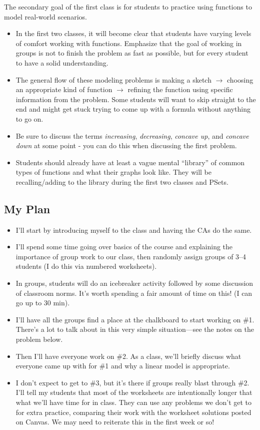 \documentclass[10pt]{article}
\begin{document}
\begin{plan}
    The secondary goal of the first class is for students to practice using functions to model real-world scenarios.
    \begin{itemize}
        \item In the first two classes, it will become clear that students have varying levels of comfort working with functions. Emphasize that the goal of working in groups is not to finish the problem as fast as possible, but for every student to have a solid understanding.
        \item The general flow of these modeling problems is making a sketch $\rightarrow$ choosing an appropriate kind of function $\rightarrow$ refining the function using specific information from the problem. Some students will want to skip straight to the end and might get stuck trying to come up with a formula without anything to go on.
        \item Be sure to discuss the terms \emph{increasing}, \emph{decreasing}, \emph{concave up}, and \emph{concave down} at some point - you can do this when discussing the first problem.
        \item Students should already have at least a vague mental ``library'' of common types of functions and what their graphs look like. They will be recalling/adding to the library during the first two classes and PSets.
    \end{itemize}
    
    \subsection{My Plan} %
    \begin{itemize}
        \item I'll start by introducing myself to the class and having the CAs do the same.
        \item I'll spend some time going over basics of the course and  explaining the importance of group work to our class, then randomly assign groups of 3--4 students (I do this via numbered worksheets).
        \item In groups, students will do an icebreaker activity followed by some discussion of classroom norms. It's worth spending a fair amount of time on this! (I can go up to 30 min).
        \item I'll have all the groups find a place at the chalkboard to start working on \#1. There's a lot to talk about in this very simple situation---see the notes on the problem below.
        \item Then I'll have everyone work on \#2. As a class, we'll briefly discuss what everyone came up with for \#1 and why a linear model is appropriate.
        \item I don't expect to get to \#3, but it's there if groups really blast through \#2. I'll tell my students that most of the worksheets are intentionally longer that what we'll have time for in class. They can use any problems we don't get to for extra practice, comparing their work with the worksheet solutions posted on Canvas. We may need to reiterate this in the first week or so!
    \end{itemize}
    

\end{plan}
\end{document}
